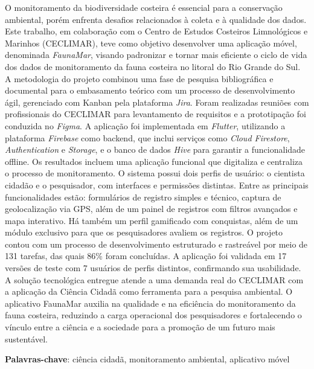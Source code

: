\setlength{\absparsep}{18pt} %
\begin{resumo}
O monitoramento da biodiversidade costeira é essencial para a conservação ambiental, porém enfrenta desafios relacionados à coleta e à qualidade dos dados. Este trabalho, em colaboração com o Centro de Estudos Costeiros Limnológicos e Marinhos (CECLIMAR), teve como objetivo desenvolver uma aplicação móvel, denominada \textit{FaunaMar}, visando padronizar e tornar mais eficiente o ciclo de vida dos dados de monitoramento da fauna costeira no litoral do Rio Grande do Sul.
A metodologia do projeto combinou uma fase de pesquisa bibliográfica e documental para o embasamento teórico com um processo de desenvolvimento ágil, gerenciado com Kanban pela plataforma \textit{Jira}. Foram realizadas reuniões com profissionais do CECLIMAR para levantamento de requisitos e a prototipação foi conduzida no \textit{Figma}. A aplicação foi implementada em \textit{Flutter}, utilizando a plataforma \textit{Firebase} como backend, que inclui serviços como \textit{Cloud Firestore}, \textit{Authentication} e \textit{Storage}, e o banco de dados \textit{Hive} para garantir a funcionalidade offline.
Os resultados incluem uma aplicação funcional que digitaliza e centraliza o processo de monitoramento. O sistema possui dois perfis de usuário: o cientista cidadão e o pesquisador, com interfaces e permissões distintas. Entre as principais funcionalidades estão: formulários de registro simples e técnico, captura de geolocalização via GPS, além de um painel de registros com filtros avançados e mapa interativo. Há também um perfil gamificado com conquistas, além de um módulo exclusivo para que os pesquisadores avaliem os registros. O projeto contou com um processo de desenvolvimento estruturado e rastreável por meio de 131 tarefas, das quais 86\% foram concluídas. A aplicação foi validada em 17 versões de teste com 7 usuários de perfis distintos, confirmando sua usabilidade. A solução tecnológica entregue atende a uma demanda real do CECLIMAR com a aplicação da Ciência Cidadã como ferramenta para a pesquisa ambiental. O aplicativo FaunaMar auxilia na qualidade e na eficiência do monitoramento da fauna costeira, reduzindo a carga operacional dos pesquisadores e fortalecendo o vínculo entre a ciência e a sociedade para a promoção de um futuro mais sustentável.

\textbf{Palavras-chave}: ciência cidadã, monitoramento ambiental, aplicativo móvel
\end{resumo}